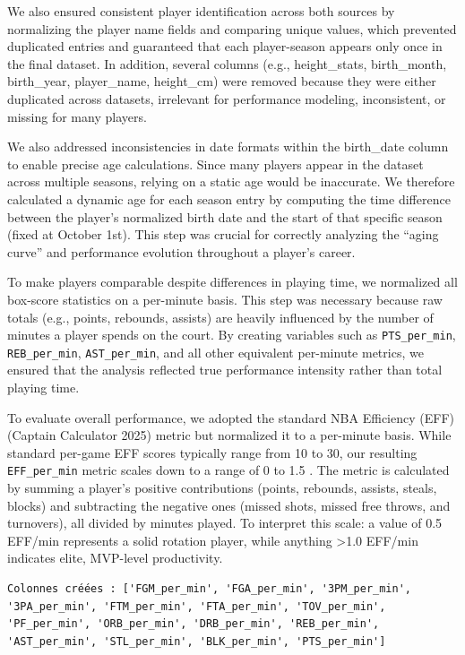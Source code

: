 \documentclass[
  letterpaper,
  DIV=11,
  numbers=noendperiod]{scrartcl}
\begin{document}
We also ensured consistent player identification across both sources by
normalizing the player name fields and comparing unique values, which
prevented duplicated entries and guaranteed that each player-season
appears only once in the final dataset. In addition, several columns
(e.g., height\_stats, birth\_month, birth\_year, player\_name,
height\_cm) were removed because they were either duplicated across
datasets, irrelevant for performance modeling, inconsistent, or missing
for many players.

We also addressed inconsistencies in date formats within the birth\_date
column to enable precise age calculations. Since many players appear in
the dataset across multiple seasons, relying on a static age would be
inaccurate. We therefore calculated a dynamic age for each season entry
by computing the time difference between the player's normalized birth
date and the start of that specific season (fixed at October 1st). This
step was crucial for correctly analyzing the ``aging curve'' and
performance evolution throughout a player's career.

To make players comparable despite differences in playing time, we
normalized all box-score statistics on a per-minute basis. This step was
necessary because raw totals (e.g., points, rebounds, assists) are
heavily influenced by the number of minutes a player spends on the
court. By creating variables such as \texttt{PTS\_per\_min},
\texttt{REB\_per\_min}, \texttt{AST\_per\_min}, and all other equivalent
per-minute metrics, we ensured that the analysis reflected true
performance intensity rather than total playing time.

To evaluate overall performance, we adopted the standard NBA Efficiency
(EFF)(Captain Calculator 2025) metric but normalized it to a per-minute
basis. While standard per-game EFF scores typically range from 10 to 30,
our resulting \texttt{EFF\_per\_min} metric scales down to a range of 0
to 1.5 . The metric is calculated by summing a player's positive
contributions (points, rebounds, assists, steals, blocks) and
subtracting the negative ones (missed shots, missed free throws, and
turnovers), all divided by minutes played. To interpret this scale: a
value of 0.5 EFF/min represents a solid rotation player, while anything
\textgreater1.0 EFF/min indicates elite, MVP-level productivity.

\begin{verbatim}
Colonnes créées : ['FGM_per_min', 'FGA_per_min', '3PM_per_min', '3PA_per_min', 'FTM_per_min', 'FTA_per_min', 'TOV_per_min', 'PF_per_min', 'ORB_per_min', 'DRB_per_min', 'REB_per_min', 'AST_per_min', 'STL_per_min', 'BLK_per_min', 'PTS_per_min']
\end{verbatim}
\end{document}
